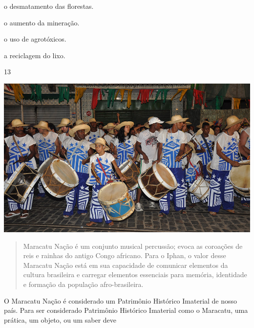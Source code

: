 \begin{minipage}{0.5\textwidth}
\begin{escolha}
\item o desmatamento das florestas.

\item o aumento da mineração.

\item o uso de agrotóxicos.

\item a reciclagem do lixo.
\end{escolha}
\end{minipage}

\num{13}

\begin{minipage}{0.5\textwidth}
\includegraphics[width=.95\textwidth]{./imgs/img66.png}
\end{minipage}
\begin{minipage}{0.5\textwidth}
\begin{quote}
Maracatu Nação é um conjunto musical percussão; evoca as coroações de reis e rainhas do antigo Congo africano.
Para o Iphan, o valor desse Maracatu Nação está em sua
capacidade de comunicar elementos da cultura brasileira e carregar
elementos essenciais para memória, identidade e formação da
população afro-brasileira.

\end{quote}
\end{minipage}\bigskip

\noindent{}O Maracatu Nação é considerado um Patrimônio Histórico Imaterial de
nosso país. Para ser considerado Patrimônio Histórico Imaterial como o
Maracatu, uma prática, um objeto, ou um saber deve

